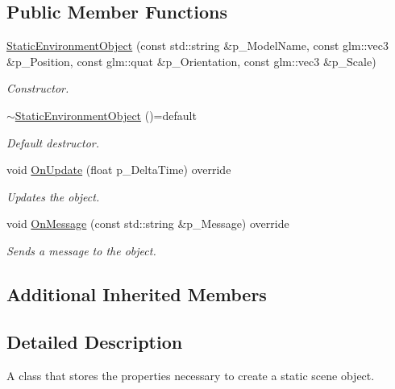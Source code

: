 \subsection*{Public Member Functions}
\begin{DoxyCompactItemize}
\item 
\mbox{\hyperlink{class_static_environment_object_a6c99f3d0d1050d47dfe26937959bda41}{Static\+Environment\+Object}} (const std\+::string \&p\+\_\+\+Model\+Name, const glm\+::vec3 \&p\+\_\+\+Position, const glm\+::quat \&p\+\_\+\+Orientation, const glm\+::vec3 \&p\+\_\+\+Scale)
\begin{DoxyCompactList}\small\item\em Constructor. \end{DoxyCompactList}\item 
\mbox{\label{class_static_environment_object_a64985e8b950766261690318842c7d2a8}} 
\mbox{\hyperlink{class_static_environment_object_a64985e8b950766261690318842c7d2a8}{$\sim$\+Static\+Environment\+Object}} ()=default
\begin{DoxyCompactList}\small\item\em Default destructor. \end{DoxyCompactList}\item 
void \mbox{\hyperlink{class_static_environment_object_accbe302e081137786ee1958d657f0271}{On\+Update}} (float p\+\_\+\+Delta\+Time) override
\begin{DoxyCompactList}\small\item\em Updates the object. \end{DoxyCompactList}\item 
void \mbox{\hyperlink{class_static_environment_object_afa722f23bf3c503edcacc60efec3f692}{On\+Message}} (const std\+::string \&p\+\_\+\+Message) override
\begin{DoxyCompactList}\small\item\em Sends a message to the object. \end{DoxyCompactList}\end{DoxyCompactItemize}
\subsection*{Additional Inherited Members}


\subsection{Detailed Description}
A class that stores the properties necessary to create a static scene object. 

